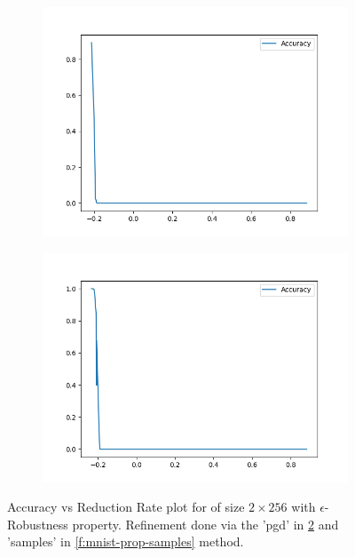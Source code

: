 \begin{figure}
    \begin{subfigure}{0.475\linewidth}
        \includegraphics[scale=0.275]{figs/acas_ncex_1_5_4_samples.png}
        \caption{}
        \label{f:acas-ncex-samples}
    \end{subfigure}
    \begin{subfigure}{0.475\linewidth}
        \includegraphics[scale=0.275]{figs/acas_ncex_1_5_4_pgd.png}
        \caption{}
        \label{f:mnist-prop-pgd}
    \end{subfigure}

    \caption{Accuracy vs Reduction Rate plot for \mnist of size $2 \times 256$
        with $\epsilon$-Robustness property. Refinement done via the 'pgd' in
        \ref{f:mnist-prop-pgd} and 'samples' in \ref{f:mnist-prop-samples}
    method. }
    \label{f:ncex}
\end{figure}

